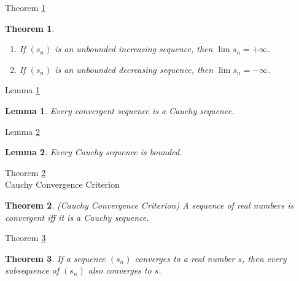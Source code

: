 \documentclass[avery5371,grid]{flashcards}
\newtheorem{lemma}{Lemma}
\newtheorem{theorem}{Theorem}
\begin{document}
\begin{flashcard}[Theorem]{Theorem \ref{thm59}}
\begin{theorem}
\label{thm59} \quad \\
\begin{enumerate}
\item If $(s_n)$ is an unbounded increasing sequence, then $\lim s_n = + \infty$.
\item If $(s_n)$ is an unbounded decreasing sequence, then $\lim s_n = - \infty$.
\end{enumerate}
\end{theorem}
\end{flashcard}

\begin{flashcard}[Lemma]{Lemma \ref{lem02}}
\begin{lemma}
\label{lem02}
Every convergent sequence is a Cauchy sequence.
\end{lemma}
\end{flashcard}

\begin{flashcard}[Lemma]{Lemma \ref{lem03}}
\begin{lemma}
\label{lem03}
Every Cauchy sequence is bounded.
\end{lemma}
\end{flashcard}

\begin{flashcard}[Theorem]{Theorem \ref{thm60} \\ Cauchy Convergence
Criterion}
\begin{theorem}
\label{thm60}
(Cauchy Convergence Criterion)  A sequence of real numbers is convergent
iff it is a Cauchy sequence.
\end{theorem}
\end{flashcard}

\begin{flashcard}[Theorem]{Theorem \ref{thm61}}
\begin{theorem}
\label{thm61}
If a sequence $(s_n)$ converges to a real number $s$, then every
subsequence of $(s_n)$ also converges to $s$.
\end{theorem}
\end{flashcard}
\end{document}
